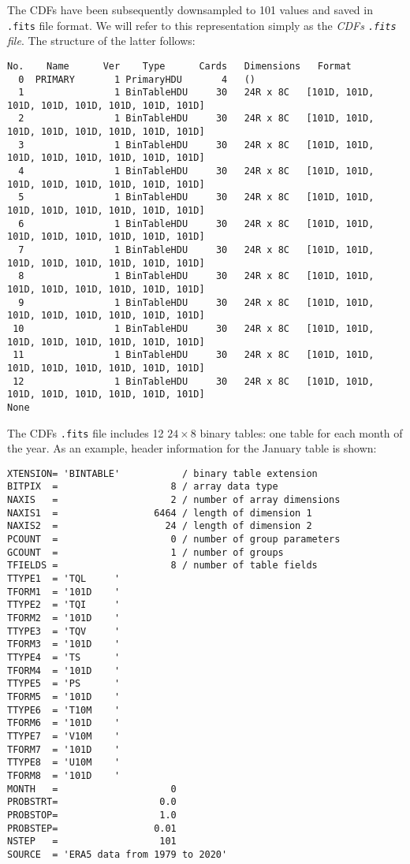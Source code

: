 The CDFs have been subsequently downsampled to \num{101} values and saved
in \texttt{.fits} file format. We will refer to this representation simply
as the \emph{CDFs \texttt{.fits} file}. The structure of the latter
follows:

\begin{Verbatim}[fontsize=\scriptsize]
No.    Name      Ver    Type      Cards   Dimensions   Format
  0  PRIMARY       1 PrimaryHDU       4   ()
  1                1 BinTableHDU     30   24R x 8C   [101D, 101D, 101D, 101D, 101D, 101D, 101D, 101D]
  2                1 BinTableHDU     30   24R x 8C   [101D, 101D, 101D, 101D, 101D, 101D, 101D, 101D]
  3                1 BinTableHDU     30   24R x 8C   [101D, 101D, 101D, 101D, 101D, 101D, 101D, 101D]
  4                1 BinTableHDU     30   24R x 8C   [101D, 101D, 101D, 101D, 101D, 101D, 101D, 101D]
  5                1 BinTableHDU     30   24R x 8C   [101D, 101D, 101D, 101D, 101D, 101D, 101D, 101D]
  6                1 BinTableHDU     30   24R x 8C   [101D, 101D, 101D, 101D, 101D, 101D, 101D, 101D]
  7                1 BinTableHDU     30   24R x 8C   [101D, 101D, 101D, 101D, 101D, 101D, 101D, 101D]
  8                1 BinTableHDU     30   24R x 8C   [101D, 101D, 101D, 101D, 101D, 101D, 101D, 101D]
  9                1 BinTableHDU     30   24R x 8C   [101D, 101D, 101D, 101D, 101D, 101D, 101D, 101D]
 10                1 BinTableHDU     30   24R x 8C   [101D, 101D, 101D, 101D, 101D, 101D, 101D, 101D]
 11                1 BinTableHDU     30   24R x 8C   [101D, 101D, 101D, 101D, 101D, 101D, 101D, 101D]
 12                1 BinTableHDU     30   24R x 8C   [101D, 101D, 101D, 101D, 101D, 101D, 101D, 101D]
None
\end{Verbatim}

The CDFs \texttt{.fits} file includes \num{12} $24 \times 8$ binary tables:
one table for each month of the year. As an example, header information for
the January table is shown:

\begin{Verbatim}
XTENSION= 'BINTABLE'           / binary table extension
BITPIX  =                    8 / array data type
NAXIS   =                    2 / number of array dimensions
NAXIS1  =                 6464 / length of dimension 1
NAXIS2  =                   24 / length of dimension 2
PCOUNT  =                    0 / number of group parameters
GCOUNT  =                    1 / number of groups
TFIELDS =                    8 / number of table fields
TTYPE1  = 'TQL     '
TFORM1  = '101D    '
TTYPE2  = 'TQI     '
TFORM2  = '101D    '
TTYPE3  = 'TQV     '
TFORM3  = '101D    '
TTYPE4  = 'TS      '
TFORM4  = '101D    '
TTYPE5  = 'PS      '
TFORM5  = '101D    '
TTYPE6  = 'T10M    '
TFORM6  = '101D    '
TTYPE7  = 'V10M    '
TFORM7  = '101D    '
TTYPE8  = 'U10M    '
TFORM8  = '101D    '
MONTH   =                    0
PROBSTRT=                  0.0
PROBSTOP=                  1.0
PROBSTEP=                 0.01
NSTEP   =                  101
SOURCE  = 'ERA5 data from 1979 to 2020'
\end{Verbatim}

